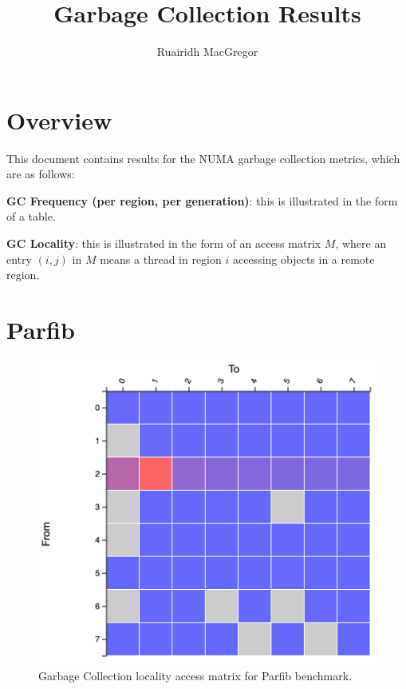 \documentclass[a4paper,11pt]{article}
\title{Garbage Collection Results}
\author{Ruairidh MacGregor}
\date{}
\begin{document}
\maketitle

\section{Overview}

This document contains results for the NUMA garbage collection metrics, which are as follows:

\begin{description}
\item \textbf{GC Frequency (per region, per generation)}: this is illustrated in the form of a table. 
\item \textbf{GC Locality}: this is illustrated in the form of an access matrix $M$, where an entry $(i,j)$ in $M$ means a thread in region $i$ accessing objects in a remote region.
\end{description}

\section{Parfib}

\begin{table}[!htb]
  \centering
  \caption{Garbage Collection frequencies per region and per generation.}
  \label{table:baseline}
\end{table}

\begin{figure}[!htb]
    \centering
    \includegraphics[width=0.6\linewidth]{TechMemo/gc/images/parfib_gc.png}
    \caption{Garbage Collection locality access matrix for Parfib benchmark.}
    \label{fig:my_label}
\end{figure}
\end{document}
